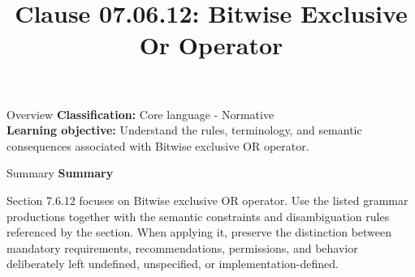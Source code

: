 \documentclass[10pt,letterpaper]{article}
\title{Clause 07.06.12: Bitwise Exclusive Or Operator}
\author{}
\date{}
\begin{document}
\maketitle
\begin{CornellOverviewBox}{Overview}
\textbf{Classification:} Core language - Normative\\[2pt]
\textbf{Learning objective:} Understand the rules, terminology, and semantic consequences associated with Bitwise exclusive OR operator.
\end{CornellOverviewBox}\begin{CornellSummaryBox}{Summary}
{\sffamily\bfseries\color{Accent} Summary}\par\vspace{3pt}Section 7.6.12 focuses on Bitwise exclusive OR operator. Use the listed grammar productions together with the semantic constraints and disambiguation rules referenced by the section. When applying it, preserve the distinction between mandatory requirements, recommendations, permissions, and behavior deliberately left undefined, unspecified, or implementation-defined.
\end{CornellSummaryBox}
\end{document}

